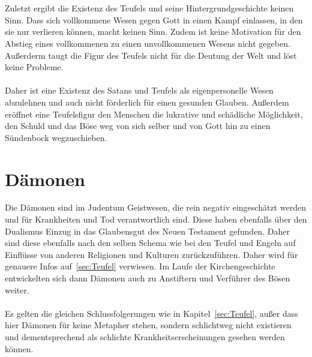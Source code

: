 \\~\\
Zuletzt ergibt die Existenz des Teufels und seine Hintergrundgeschichte keinen Sinn. Dass sich vollkommene Wesen gegen Gott in einen Kampf einlassen, in den sie nur verlieren können, macht keinen Sinn. Zudem ist keine Motivation für den Abstieg eines vollkommenen zu einen unvollkommenen Wesens nicht gegeben.
Außerderm taugt die Figur des Teufels nicht für die Deutung der Welt und löst keine Probleme.
\\~\\
Daher ist eine Existenz des Satans und Teufels als eigenpersonelle Wesen abzulehnen und auch nicht förderlich für einen gesunden Glauben. Außerdem eröffnet eine Teufelsfigur den Menschen die lukrative und schädliche Möglichkeit, den Schuld und das Böse weg von sich selber und von Gott hin zu einen Sündenbock wegzuschieben.

\section{Dämonen}
Die Dämonen sind im Judentum Geistwesen, die rein negativ eingeschätzt werden und für Krankheiten und Tod verantwortlich sind. Diese haben ebenfalls über den Dualismus Einzug in das Glaubensgut des Neuen Testament gefunden. Daher sind diese ebenfalls nach den selben Schema wie bei den Teufel und Engeln auf Einflüsse von anderen Religionen und Kulturen zurückzuführen. Daher wird für genauere Infos auf\ \ref{sec:Teufel} verwiesen. Im Laufe der Kirchengeschichte entwickelten sich dann Dämonen auch zu Anstiftern und Verführer des Bösen weiter.
\\~\\
Es gelten die gleichen Schlussfolgerungen wie in Kapitel\ \ref{sec:Teufel}, außer dass hier Dämonen für keine Metapher stehen, sondern schlichtweg nicht existieren und dementsprechend als schlichte Krankheitserscheinungen gesehen werden können.
